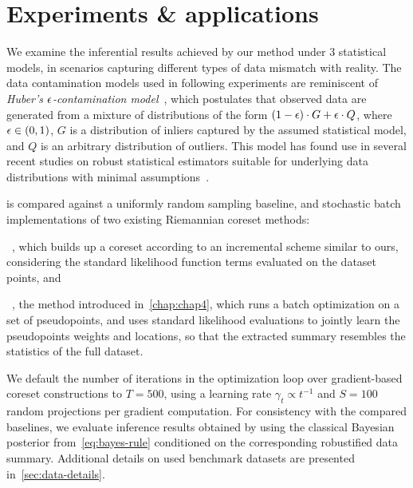 \section{Experiments \& applications}
\label{sec:evaluation}
\newcommand{\MYhref}[3][oxfordblue]{\href{#2}{\color{#1}{#3}}}%

We examine the inferential results achieved by our method under 3 statistical models, in scenarios capturing different types of data mismatch with reality. The data contamination models used in following experiments are reminiscent of \emph{Huber's $\epsilon$-contamination model}~\citep{huber92}, which postulates that observed data are generated from a mixture of distributions of the form $(1-\epsilon)\cdot G+ \epsilon\cdot Q$, where $\epsilon \in (0,1)$,  $G$ is a distribution of inliers captured by the assumed statistical model, and $Q$ is an arbitrary distribution of outliers. This model has found use in several recent studies on robust statistical estimators suitable for underlying data distributions with minimal assumptions~\citep{wei17, chen18}.

\bcores{} is compared against a uniformly random sampling baseline, and stochastic batch implementations of two existing Riemannian coreset methods: 
\benum[label={(\roman*)}]
	\item \sparsevi~\cite{campbell19neurips}, which builds up a coreset according to an incremental scheme similar to ours, considering the standard likelihood function terms evaluated on the dataset points, and 
	\item \psvi~\cite{psvi}, the method introduced in~\cref{chap:chap4}, which runs a batch optimization on a set of pseudopoints, and uses standard likelihood evaluations to jointly learn the pseudopoints weights and locations, so that the extracted summary resembles the statistics of the full dataset. 
\eenum


We default the number of iterations in the optimization loop over gradient-based coreset constructions to $ T = 500$, using a learning rate $ \gamma_t \propto t^{-1}$ and $S=100$ random projections per gradient computation. For consistency with the compared baselines, we evaluate inference results obtained by \bcores{} using the classical Bayesian posterior from~\cref{eq:bayes-rule} conditioned on the corresponding robustified data summary. Additional details on used benchmark datasets are presented in~\cref{sec:data-details}. %

